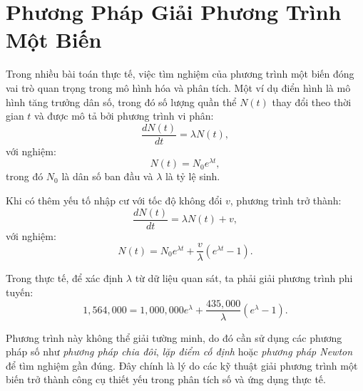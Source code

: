 
\vspace*{1em}
\chapter{Phương Pháp Giải Phương Trình Một Biến}

Trong nhiều bài toán thực tế, việc tìm nghiệm của phương trình một biến đóng vai trò quan trọng trong mô hình hóa và phân tích. Một ví dụ điển hình là mô hình tăng trưởng dân số, trong đó số lượng quần thể $N(t)$ thay đổi theo thời gian $t$ và được mô tả bởi phương trình vi phân:
\[
\frac{dN(t)}{dt} = \lambda N(t),
\]
với nghiệm:
\[
N(t) = N_0 e^{\lambda t},
\]
trong đó $N_0$ là dân số ban đầu và $\lambda$ là tỷ lệ sinh.

\begin{center}
\end{center}


Khi có thêm yếu tố nhập cư với tốc độ không đổi $v$, phương trình trở thành:
\[
\frac{dN(t)}{dt} = \lambda N(t) + v,
\]
với nghiệm:
\[
N(t) = N_0 e^{\lambda t} + \frac{v}{\lambda}(e^{\lambda t} - 1).
\]

Trong thực tế, để xác định $\lambda$ từ dữ liệu quan sát, ta phải giải phương trình phi tuyến:
\[
1{,}564{,}000 = 1{,}000{,}000 e^{\lambda} + \frac{435{,}000}{\lambda}(e^{\lambda} - 1).
\]

Phương trình này không thể giải tường minh, do đó cần sử dụng các phương pháp số như \textit{phương pháp chia đôi}, \textit{lặp điểm cố định} hoặc \textit{phương pháp Newton} để tìm nghiệm gần đúng. Đây chính là lý do các kỹ thuật giải phương trình một biến trở thành công cụ thiết yếu trong phân tích số và ứng dụng thực tế.


